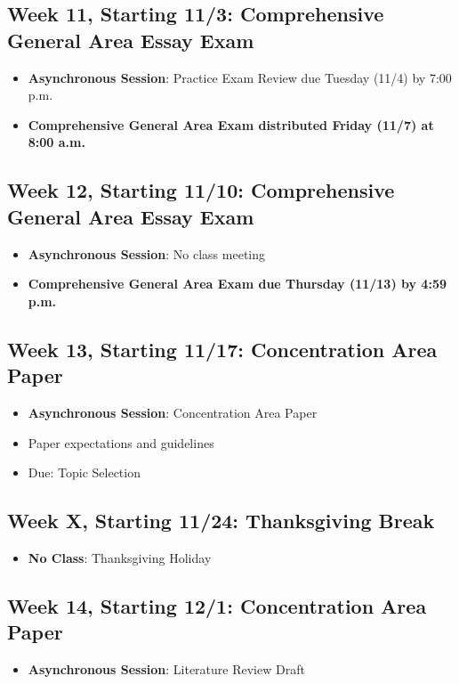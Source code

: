\documentclass[12pt]{article}     %
\begin{document}
\subsection*{Week 11, Starting 11/3: Comprehensive General Area Essay Exam}
\begin{itemize}
    \item \textbf{Asynchronous Session}: Practice Exam Review due Tuesday (11/4) by 7:00 p.m.
    \item \textbf{Comprehensive General Area Exam distributed Friday (11/7) at 8:00 a.m.}
\end{itemize}

\subsection*{Week 12, Starting 11/10: Comprehensive General Area Essay Exam}
\begin{itemize}
    \item \textbf{Asynchronous Session}: No class meeting
    \item \textbf{Comprehensive General Area Exam due Thursday (11/13) by 4:59 p.m.}
\end{itemize}

\subsection*{Week 13, Starting 11/17: Concentration Area Paper}
\begin{itemize}
    \item \textbf{Asynchronous Session}: Concentration Area Paper
    \item Paper expectations and guidelines 
    \item Due: Topic Selection
\end{itemize}

\subsection*{Week X, Starting 11/24: Thanksgiving Break}
\begin{itemize}
    \item \textbf{No Class}: Thanksgiving Holiday
\end{itemize}

\subsection*{Week 14, Starting 12/1: Concentration Area Paper}
\begin{itemize}
    \item \textbf{Asynchronous Session}: Literature Review Draft
\end{itemize}
\end{document}

